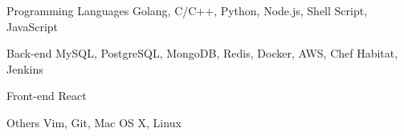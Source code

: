 

\begin{cvskills}

  \cvskill
    {Programming Languages}
    {Golang, C/C++, Python, Node.js, Shell Script, JavaScript}

  \cvskill
    {Back-end}
    {MySQL, PostgreSQL, MongoDB, Redis, Docker, AWS, Chef Habitat, Jenkins}

  \cvskill
    {Front-end}
    {React}

  \cvskill
    {Others}
    {Vim, Git, Mac OS X, Linux}

\end{cvskills}
